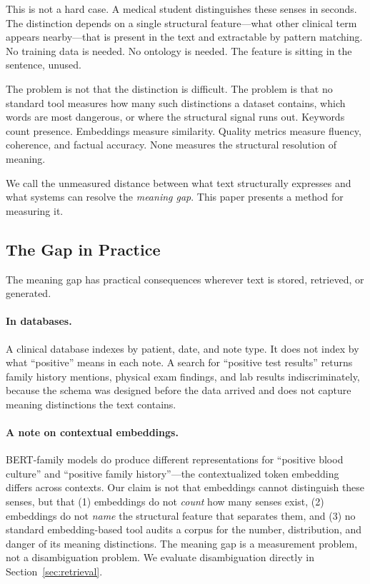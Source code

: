 \documentclass[11pt,a4paper]{article}
\begin{document}
This is not a hard case. A medical student distinguishes these senses in seconds. The distinction depends on a single structural feature---what other clinical term appears nearby---that is present in the text and extractable by pattern matching. No training data is needed. No ontology is needed. The feature is sitting in the sentence, unused.

The problem is not that the distinction is difficult. The problem is that no standard tool measures how many such distinctions a dataset contains, which words are most dangerous, or where the structural signal runs out. Keywords count presence. Embeddings measure similarity. Quality metrics measure fluency, coherence, and factual accuracy. None measures the structural resolution of meaning.

We call the unmeasured distance between what text structurally expresses and what systems can resolve the \emph{meaning gap}. This paper presents a method for measuring it.

\subsection{The Gap in Practice}

The meaning gap has practical consequences wherever text is stored, retrieved, or generated.

\paragraph{In databases.} A clinical database indexes by patient, date, and note type. It does not index by what ``positive'' means in each note. A search for ``positive test results'' returns family history mentions, physical exam findings, and lab results indiscriminately, because the schema was designed before the data arrived and does not capture meaning distinctions the text contains.

\paragraph{A note on contextual embeddings.} BERT-family models do produce different representations for ``positive blood culture'' and ``positive family history''---the contextualized token embedding differs across contexts. Our claim is not that embeddings cannot distinguish these senses, but that (1) embeddings do not \emph{count} how many senses exist, (2) embeddings do not \emph{name} the structural feature that separates them, and (3) no standard embedding-based tool audits a corpus for the number, distribution, and danger of its meaning distinctions. The meaning gap is a measurement problem, not a disambiguation problem. We evaluate disambiguation directly in Section~\ref{sec:retrieval}.
\end{document}

